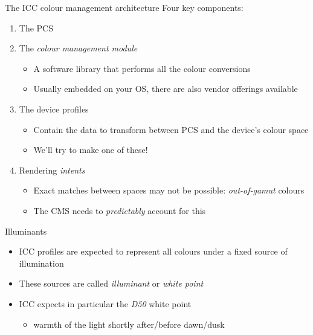 \documentclass[aspectratio=169]{fireshonks}
\begin{document}
\begin{frame}{The ICC colour management architecture}
  Four key components:
  \begin{enumerate}[<+(1)->]
    \item The PCS
    \item The \emph{colour management module}
          \begin{itemize}
            \item A software library that performs all the colour conversions
            \item Usually embedded on your OS, there are also vendor offerings available
          \end{itemize}
    \item The device profiles
          \begin{itemize}
            \item Contain the data to transform between PCS and the device's colour space
            \item {} We'll try to make one of these!
          \end{itemize}
    \item Rendering \emph{intents}
          \begin{itemize}
            \item Exact matches between spaces may not be possible: \emph{out-of-gamut} colours
            \item The CMS needs to \emph{predictably} account for this
          \end{itemize}
  \end{enumerate}
\end{frame}
\begin{frame}{Illuminants}
  \begin{itemize}
    \item ICC profiles are expected to represent all colours under a fixed source of illumination
    \item These sources are called \emph{illuminant} or \emph{white point}
    \item ICC expects in particular the \emph{D50} white point
          \begin{itemize}
            \item warmth of the light shortly after/before dawn/dusk \autocite{tooms}
          \end{itemize}
  \end{itemize}
\end{frame}
\end{document}
